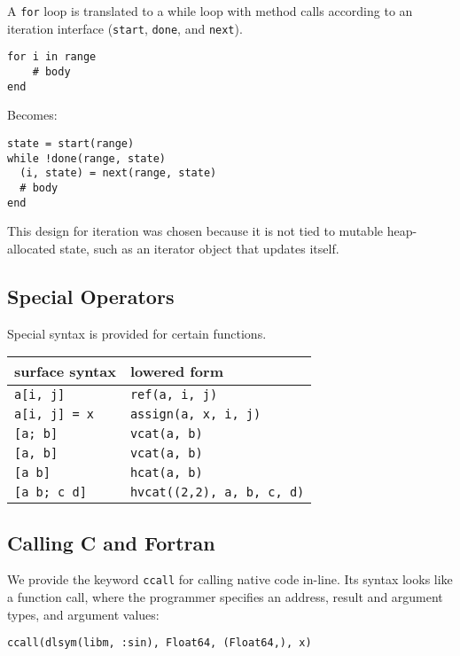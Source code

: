 \documentclass[9pt]{sigplanconf}
\begin{document}
A {\tt for} loop is translated to a while loop with method calls according
to an iteration interface ({\tt start}, {\tt done}, and {\tt next}).

\begin{verbatim}
for i in range
    # body
end
\end{verbatim}

Becomes:

\begin{verbatim}
state = start(range)
while !done(range, state)
  (i, state) = next(range, state)
  # body
end
\end{verbatim}

This design for iteration was chosen because it is not tied to mutable
heap-allocated state, such as an iterator object that updates itself.

\subsection{Special Operators}

Special syntax is provided for certain functions.

\begin{tabular}{|l|l|}\hline
surface syntax     & lowered form \\\hline \hline
{\tt a[i, j]}      & {\tt ref(a, i, j)} \\\hline
{\tt a[i, j] = x}  & {\tt assign(a, x, i, j)} \\\hline
{\tt [a; b]}       & {\tt vcat(a, b)} \\\hline
{\tt [a, b]}       & {\tt vcat(a, b)} \\\hline
{\tt [a b]}        & {\tt hcat(a, b)} \\\hline
{\tt [a b; c d]}   & {\tt hvcat((2,2), a, b, c, d)}\\\hline
\end{tabular}


\subsection{Calling C and Fortran}

We provide the keyword {\tt ccall} for calling native code in-line.
Its syntax looks like a function call, where the programmer specifies
an address, result and argument types, and argument values:

\begin{verbatim}
ccall(dlsym(libm, :sin), Float64, (Float64,), x)
\end{verbatim}
\end{document}
